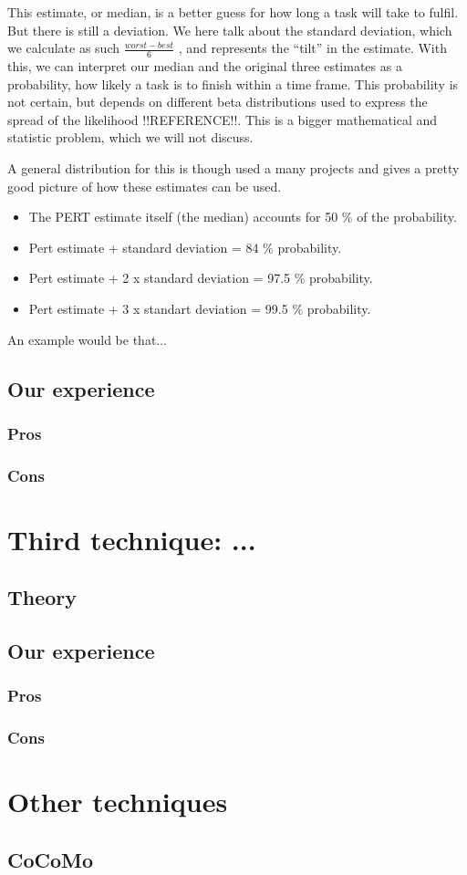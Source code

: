 This estimate, or median, is a better guess for how long a task will take to fulfil. But there is still a deviation. We here talk about the standard deviation, which we calculate as such
$\frac{worst-best}{6}$
, and represents the ``tilt'' in the estimate. With this, we can interpret our median and the original three estimates as a probability, how likely a task is to finish within a time frame. This probability is not certain, but depends on different beta distributions used to express the spread of the likelihood !!REFERENCE!!. This is a bigger mathematical and statistic problem, which we will not discuss.\

A general distribution for this is though used a many projects and gives a pretty good picture of how these estimates can be used.\
\begin{itemize}


\item The PERT estimate itself (the median) accounts for 50 \% of the probability.
\item Pert estimate + standard deviation = 84 \% probability.
\item Pert estimate + 2 x standard deviation = 97.5 \% probability.
\item Pert estimate + 3 x standart deviation = 99.5 \% probability.
\end{itemize}
An example would be that...


\subsection{Our experience}

\subsubsection{Pros}

\subsubsection{Cons}

\section{Third technique: ...}
\subsection{Theory}

\subsection{Our experience}

\subsubsection{Pros}

\subsubsection{Cons}

\section{Other techniques}
\subsection{CoCoMo}
